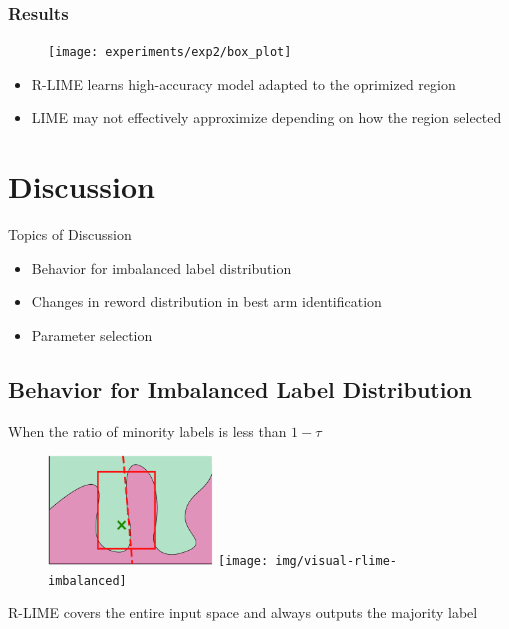 \documentclass[aspectratio=169]{slide-en}
\begin{document}
\subsubsection{Results}
\begin{frame}{}
  \begin{figure}
    \texttt{[image: experiments/exp2/box\_plot]}
  \end{figure}
  \begin{itemize}
    \item R-LIME learns high-accuracy model adapted to the oprimized region
    \item LIME may not effectively approximize depending on how the region selected
  \end{itemize}
\end{frame}

\section{Discussion}

\begin{frame}{}
  Topics of Discussion
  \begin{itemize}
    \item Behavior for imbalanced label distribution
    \item Changes in reword distribution in best arm identification
    \item Parameter selection
  \end{itemize}
\end{frame}

\subsection{Behavior for Imbalanced Label Distribution}

\begin{frame}{}
  When the ratio of minority labels is less than $1-\tau$
  \begin{figure}
    \centering
    \includegraphics[width=0.39\textwidth]{img/visual-rlime3}
    \hspace{1em}
    \texttt{[image: img/visual-rlime-imbalanced]}
  \end{figure}
  R-LIME covers the entire input space and always outputs the majority label
\end{frame}
\end{document}

